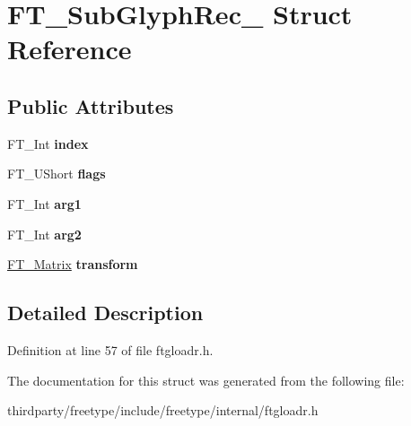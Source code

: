 \hypertarget{struct_f_t___sub_glyph_rec__}{}\section{F\+T\+\_\+\+Sub\+Glyph\+Rec\+\_\+ Struct Reference}
\label{struct_f_t___sub_glyph_rec__}
\subsection*{Public Attributes}
\begin{DoxyCompactItemize}
\item 
\mbox{\label{struct_f_t___sub_glyph_rec___aa4febc2d867ff074ac116b068f372d3a}} 
F\+T\+\_\+\+Int {\bfseries index}
\item 
\mbox{\label{struct_f_t___sub_glyph_rec___a2d02aefc16061f7e039f76074518f6e5}} 
F\+T\+\_\+\+U\+Short {\bfseries flags}
\item 
\mbox{\label{struct_f_t___sub_glyph_rec___ad9f6b04ef50e1b39db90331e76f38206}} 
F\+T\+\_\+\+Int {\bfseries arg1}
\item 
\mbox{\label{struct_f_t___sub_glyph_rec___a0d27a8b473379cedeb061f9ecd7e97da}} 
F\+T\+\_\+\+Int {\bfseries arg2}
\item 
\mbox{\label{struct_f_t___sub_glyph_rec___a3c5fc1959a357c6c2b970ec2118d2683}} 
\hyperlink{struct_f_t___matrix__}{F\+T\+\_\+\+Matrix} {\bfseries transform}
\end{DoxyCompactItemize}


\subsection{Detailed Description}


Definition at line 57 of file ftgloadr.\+h.



The documentation for this struct was generated from the following file\+:\begin{DoxyCompactItemize}
\item 
thirdparty/freetype/include/freetype/internal/ftgloadr.\+h\end{DoxyCompactItemize}
